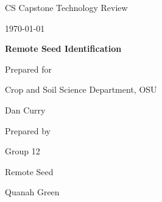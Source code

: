 \documentclass[onecolumn, draftclsnofoot,10pt, compsoc]{IEEEtran}
\def \CapstoneTeamName{		Remote Seed}
\def \CapstoneTeamNumber{		12}
\def \GroupMemberOne{			Quanah Green}
\def \CapstoneProjectName{		Remote Seed Identification}
\def \CapstoneSponsorCompany{	Crop and Soil Science Department, OSU}
\def \CapstoneSponsorPerson{		Dan Curry}
\def \DocType{		%
				Technology Review
				}
\newcommand{\NameSigPair}[1]{\par
\makebox[2.75in][r]{#1} \hfil 	\makebox[3.25in]{\makebox[2.25in]{\hrulefill} \hfill		\makebox[.75in]{\hrulefill}}
\par\vspace{-12pt} \textit{\tiny\noindent
\makebox[2.75in]{} \hfil		\makebox[3.25in]{\makebox[2.25in][r]{Signature} \hfill	\makebox[.75in][r]{Date}}}}
\renewcommand{\NameSigPair}[1]{#1}
\begin{document}
\begin{titlepage}
    \begin{singlespace}
        \hfill 
        
        \par\vspace{.2in}
        \centering
        \scshape{
            \huge CS Capstone \DocType \par
            {\large\today}\par
            \vspace{.5in}
            \textbf{\Huge\CapstoneProjectName}\par
            \vfill
            {\large Prepared for}\par
            \Huge \CapstoneSponsorCompany\par
            \vspace{5pt}
            {\Large\NameSigPair{\CapstoneSponsorPerson}\par}
            {\large Prepared by }\par
            Group\CapstoneTeamNumber\par
            \CapstoneTeamName\par 
            \vspace{5pt}
            {\Large
                \NameSigPair{\GroupMemberOne}\par
                \NameSigPair{\GroupMemberTwo}\par
                \NameSigPair{\GroupMemberThree}\par
            }
            \vspace{20pt}
        }
        \begin{abstract}
        	This document is written using one sentence per line.
        	This allows you to have sensible diffs when you use \LaTeX with version control, as well as giving a quick visual test to see if sentences are too short/long.
        	If you have questions, ``The Not So Short Guide to LaTeX'' is a great resource (\url{https://tobi.oetiker.ch/lshort/lshort.pdf})
        \end{abstract}     
    \end{singlespace}
\end{titlepage}
\newpage
{}
\tableofcontents
\clearpage
\end{document}
